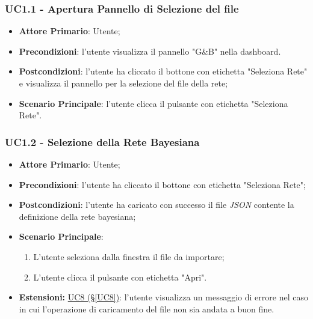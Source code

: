 \subsubsection{UC1.1 - Apertura Pannello di Selezione del file}\label{UC1.1}
\begin{itemize}
	\item \textbf{Attore Primario}: Utente;
	\item \textbf{Precondizioni}: l'utente visualizza il pannello "G\&B" nella dashboard.
	\item \textbf{Postcondizioni}: l'utente ha cliccato il bottone con etichetta "Seleziona Rete" e visualizza il pannello per la selezione del file della rete;
	\item \textbf{Scenario Principale}: l'utente clicca il pulsante con etichetta "Seleziona Rete".
\end{itemize}


\subsubsection{UC1.2 - Selezione della Rete Bayesiana}\label{UC1.2}
\begin{itemize}
	\item \textbf{Attore Primario}: Utente;
	\item \textbf{Precondizioni}: l'utente ha cliccato il bottone con etichetta "Seleziona Rete";
	\item \textbf{Postcondizioni}: l'utente ha caricato con successo il file \textit{JSON} contente la definizione della rete bayesiana;
	\item \textbf{Scenario Principale}:
	\begin{enumerate}
		\item L'utente seleziona dalla finestra il file da importare;
		\item L'utente clicca il pulsante con etichetta "Apri".
	\end{enumerate}
	\item \textbf{Estensioni:} \hyperref[UC8]{UC8 (§\ref*{UC8})}: l'utente visualizza un messaggio di errore nel caso in cui l'operazione di caricamento del file non sia andata a buon fine.
\end{itemize}

\pagebreak

